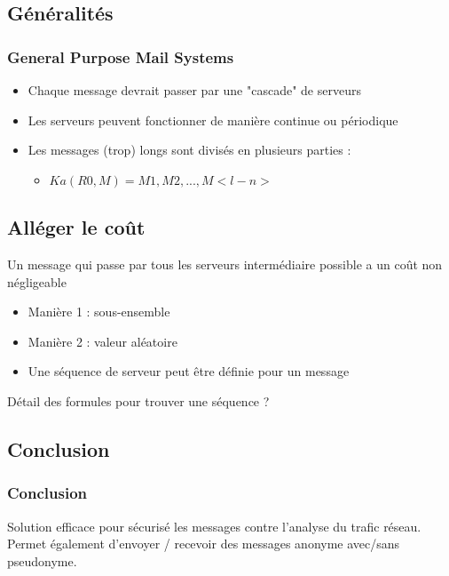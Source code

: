 \documentclass{beamer}
\begin{document}
\subsection{Généralités}
\begin{frame}
\frametitle{General Purpose Mail Systems}
\begin{itemize}
[triangle]
\item Chaque message devrait passer par une "cascade" de serveurs
\item Les serveurs peuvent fonctionner de manière continue ou périodique
\item Les messages (trop) longs sont divisés en plusieurs parties :
	\begin{itemize}
		\item $Ka( R0, M ) = M1, M2, ..., M<l-n>$
	\end{itemize}
\end{itemize}
\end{frame}

\subsection{Alléger le coût}
\begin{frame}
Un message qui passe par tous les serveurs intermédiaire possible a un coût non négligeable
\begin{itemize}
[triangle]
\item Manière 1 : sous-ensemble
\item Manière 2 : valeur aléatoire
\item Une séquence de serveur peut être définie pour un message
\end{itemize}
\end{frame}

\begin{frame}
Détail des formules pour trouver une séquence ?
\end{frame}

\subsection{Conclusion}
\begin{frame}
\frametitle{Conclusion}
Solution efficace pour sécurisé les messages contre l'analyse du trafic réseau.\\
Permet également d'envoyer / recevoir des messages anonyme avec/sans pseudonyme.
\end{frame}
\end{document}
